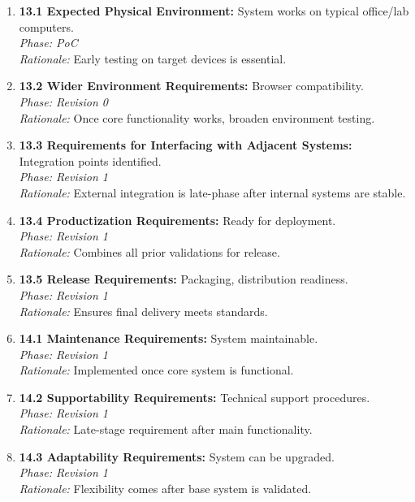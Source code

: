 \documentclass[11pt]{article}
\begin{document}
\begin{enumerate}
    \item \textbf{13.1 Expected Physical Environment:} System works on typical office/lab computers.\\
    \textit{Phase: PoC} \\
    \textit{Rationale:} Early testing on target devices is essential.

    \item \textbf{13.2 Wider Environment Requirements:} Browser compatibility.\\
    \textit{Phase: Revision 0} \\
    \textit{Rationale:} Once core functionality works, broaden environment testing.

    \item \textbf{13.3 Requirements for Interfacing with Adjacent Systems:} Integration points identified.\\
    \textit{Phase: Revision 1} \\
    \textit{Rationale:} External integration is late-phase after internal systems are stable.

    \item \textbf{13.4 Productization Requirements:} Ready for deployment.\\
    \textit{Phase: Revision 1} \\
    \textit{Rationale:} Combines all prior validations for release.

    \item \textbf{13.5 Release Requirements:} Packaging, distribution readiness.\\
    \textit{Phase: Revision 1} \\
    \textit{Rationale:} Ensures final delivery meets standards.

    \item \textbf{14.1 Maintenance Requirements:} System maintainable.\\
    \textit{Phase: Revision 1} \\
    \textit{Rationale:} Implemented once core system is functional.

    \item \textbf{14.2 Supportability Requirements:} Technical support procedures.\\
    \textit{Phase: Revision 1} \\
    \textit{Rationale:} Late-stage requirement after main functionality.

    \item \textbf{14.3 Adaptability Requirements:} System can be upgraded.\\
    \textit{Phase: Revision 1} \\
    \textit{Rationale:} Flexibility comes after base system is validated.


\end{enumerate}
\end{document}
